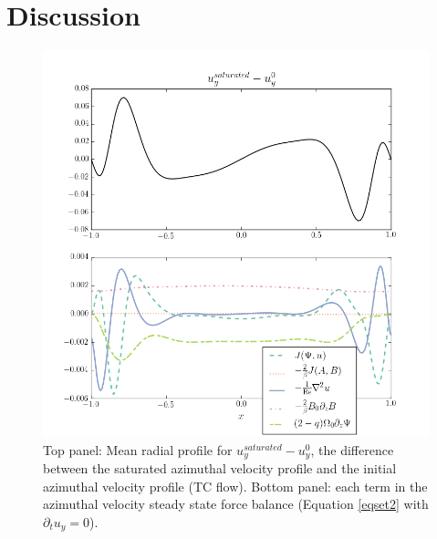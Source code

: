 \documentclass{emulateapj}
\begin{document}
\section{Discussion}
\label{sec:discussion}

\begin{figure}
\centering
\includegraphics[width=\columnwidth]{../figures/thingap_saturation_mechanism_plots_velocity_slice60.png}
\caption{Top panel: Mean radial profile for $u_y^{saturated} - u_y^0$, the difference between the saturated azimuthal velocity profile and the initial azimuthal velocity profile (TC flow). Bottom panel: each term in the azimuthal velocity steady state force balance (Equation \ref{eqset2} with $\partial_t u_{y} = 0$).} \label{fig:sat_comp_vel}
\end{figure}
\end{document}
